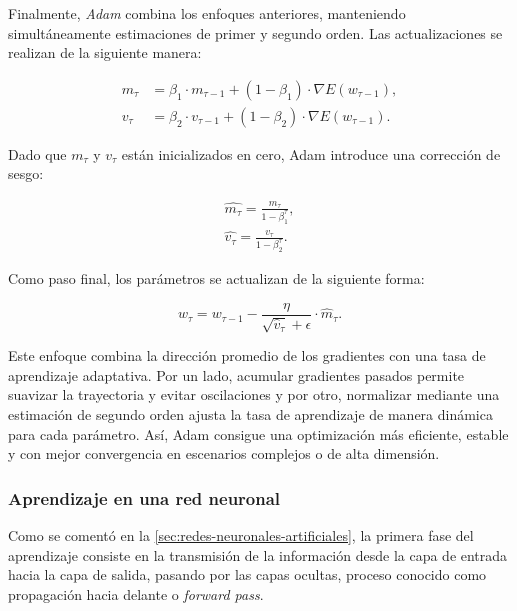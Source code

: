 Finalmente, \textit{Adam} combina los enfoques anteriores, manteniendo simultáneamente estimaciones de primer y segundo orden. Las actualizaciones se realizan de la siguiente manera:

\begin{equation}
    \begin{aligned}
        m_{\tau} &= \beta_1 \cdot m_{\tau-1} + (1 - \beta_1) \cdot \nabla E(w_{\tau - 1}), \\
        v_{\tau} &= \beta_2 \cdot v_{\tau-1} + (1 - \beta_2) \cdot \nabla E(w_{\tau - 1}).
    \end{aligned}
\end{equation}

Dado que $m_\tau$ y $v_\tau$ están inicializados en cero, Adam introduce una corrección de sesgo:

\begin{equation}
    \begin{aligned}
        \hat{m_\tau} = \frac{m_\tau}{1- \beta_1^{\tau}}, \\
        \hat{v_\tau} = \frac{v_\tau}{1- \beta_2^{\tau}}.
    \end{aligned}
\end{equation}

Como paso final, los parámetros se actualizan de la siguiente forma:

\begin{equation}
    w_{\tau} = w_{\tau - 1} - \frac{\eta}{\sqrt{\hat{v}_{\tau}} + \epsilon} \cdot \hat{m}_{\tau}.
\end{equation}

Este enfoque combina la dirección promedio de los gradientes con una tasa de aprendizaje adaptativa. Por un lado, acumular gradientes pasados permite suavizar la trayectoria y evitar oscilaciones y por otro, normalizar mediante una estimación de segundo orden ajusta la tasa de aprendizaje de manera dinámica para cada parámetro. Así, Adam consigue una optimización más eficiente, estable y con mejor convergencia en escenarios complejos o de alta dimensión.\newline

\subsubsection{Aprendizaje en una red neuronal}\label{subsubsec:aprendizaje-red-neuronal}

Como se comentó en la \autoref{sec:redes-neuronales-artificiales}, la primera fase del aprendizaje consiste en la transmisión de la información desde la capa de entrada hacia la capa de salida, pasando por las capas ocultas, proceso conocido como propagación hacia delante o \emph{forward pass}.\newline 

